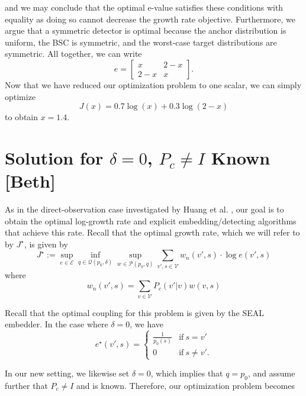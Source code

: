 \documentclass[12pt]{article}
\theoremstyle{plain}
\theoremstyle{definition}
\begin{document}
and we may conclude that the optimal e-value satisfies these conditions with equality as doing so cannot decrease the growth rate objective. Furthermore, we argue that a symmetric detector is optimal because the anchor distribution is uniform, the BSC is symmetric, and the worst-case target distributions are symmetric. All together, we can write
\begin{equation}
    e=\begin{bmatrix}
        x & 2-x \\
        2-x & x
    \end{bmatrix}.
\end{equation}
Now that we have reduced our optimization problem to one scalar, we can simply optimize
\begin{equation}
    J(x)=0.7 \log(x)+0.3\log(2-x)
\end{equation}
to obtain $x=1.4$.


\section{Solution for $\delta=0$, $P_c\neq I$ Known [Beth]}
\label{sec:del0_pc_neq_I_known}

As in the direct-observation case investigated by Huang et al. \cite{huang2026anytime}, our goal is to obtain the optimal log-growth rate and explicit embedding/detecting algorithms that achieve this rate. Recall that the optimal growth rate, which we will refer to by $J^\star$, is given by
\begin{equation}
    J^\star := \sup_{e\in\mathcal{E}}\inf_{q\in\mathcal{Q}(p_0, \delta)}\sup_{w\in\mathcal{P}(p_0,q)}\sum_{v', s\in\mathcal{V}}w_n(v',s)\cdot\log e(v', s)
\end{equation}
where
\begin{equation}
    w_n(v', s)=\sum_{v\in\mathcal{V}}P_c(v'|v)w(v,s)
\end{equation}

Recall that the optimal coupling for this problem is given by the SEAL embedder. In the case where $\delta=0$, we have
\begin{equation}
    e^\star(v',s)=\begin{cases}
        \frac{1}{p_0(s)}&\text{if}~s=v'\\
        0&\text{if}~s\neq v'.
    \end{cases}
\end{equation}

In our new setting, we likewise set $\delta=0$, which implies that $q=p_0$, and assume further that $P_c\neq I$ and is known. Therefore, our optimization problem becomes
\end{document}
